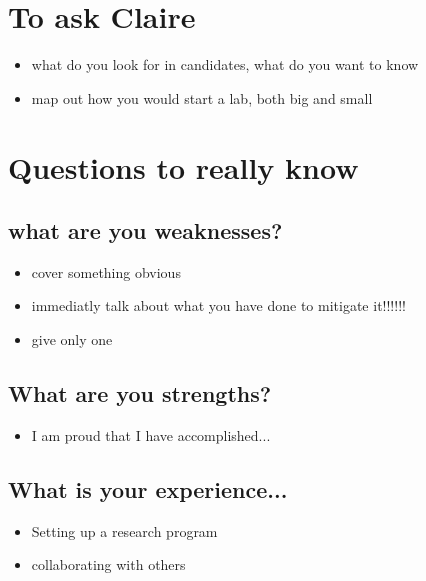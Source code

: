 \documentclass[12pt]{article}
\begin{document}
\section{To ask Claire}
\begin{itemize}
\item what do you look for in candidates, what do you want to know
\item map out how you would start a lab, both big and small
\end{itemize}


\section{Questions to really know}
\subsection{what are you weaknesses?}
\begin{itemize}
\item cover something obvious
\item immediatly talk about what you have done to mitigate it!!!!!!
\item give only one
\end{itemize}

\subsection{What are you strengths?}
\begin{itemize}
\item I am proud that I have accomplished...
\end{itemize}

\subsection{What is your experience...}
\begin{itemize}
\item Setting up a research program
\item collaborating with others
\end{itemize}
\end{document}
